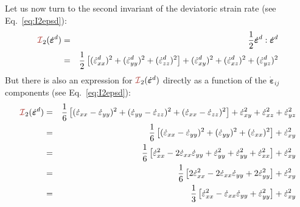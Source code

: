 Let us now turn to the second invariant of the deviatoric strain rate 
(see Eq.~\eqref{eq:I2epsd}):
\begin{eqnarray}
{\III}_2(\dot{\bm{\varepsilon}}^d)
&=& \frac{1}{2} \dot{\bm{\varepsilon}}^d:\dot{\bm{\varepsilon}}^d \\
&=& \frac{1}{2} \left[ (\dot{\varepsilon}_{xx}^d)^2 + (\dot{\varepsilon}_{yy}^d)^2 + (\dot{\varepsilon}_{zz}^d)^2   \right] 
+ (\dot{\varepsilon}_{xy}^d)^2  
+ (\dot{\varepsilon}_{xz}^d)^2  
+ (\dot{\varepsilon}_{yz}^d)^2  
\end{eqnarray}
But there is also an expression for ${\III}_2(\dot{\bm{\varepsilon}}^d)$ directly as a function of the $\dot{\bm\varepsilon}_{ij}$ components 
(see Eq.~\eqref{eq:I2epsd}):
\begin{eqnarray}
{\III}_2(\dot{\bm{\varepsilon}}^d)
&=& \frac{1}{6} \left[ (\dot{\varepsilon}_{xx}-\dot{\varepsilon}_{yy})^2 
+ (\dot{\varepsilon}_{yy}-\dot{\varepsilon}_{zz})^2 
+ (\dot{\varepsilon}_{xx}-\dot{\varepsilon}_{zz})^2 \right] 
+ \dot{\varepsilon}_{xy}^2 + \dot{\varepsilon}_{xz}^2 + \dot{\varepsilon}_{yz}^2 \\
&=& 
\frac{1}{6} \left[ (\dot{\varepsilon}_{xx}-\dot{\varepsilon}_{yy})^2 
+ (\dot{\varepsilon}_{yy})^2 
+ (\dot{\varepsilon}_{xx})^2 \right] 
+ \dot{\varepsilon}_{xy}^2 \\
&=& \frac{1}{6} \left[ \dot{\varepsilon}_{xx}^2 
-2\dot{\varepsilon}_{xx}\dot{\varepsilon}_{yy}
+\dot{\varepsilon}_{yy}^2 
+ \dot{\varepsilon}_{yy}^2 
+ \dot{\varepsilon}_{xx}^2 \right] 
+ \dot{\varepsilon}_{xy}^2 \\
&=& \frac{1}{6} \left[ 
2\dot{\varepsilon}_{xx}^2 
-2\dot{\varepsilon}_{xx}\dot{\varepsilon}_{yy}
+2\dot{\varepsilon}_{yy}^2 
\right] 
+ \dot{\varepsilon}_{xy}^2 \\
&=& 
\frac{1}{3} \left[ 
\dot{\varepsilon}_{xx}^2 
-\dot{\varepsilon}_{xx}\dot{\varepsilon}_{yy}
+\dot{\varepsilon}_{yy}^2 
\right] 
+ \dot{\varepsilon}_{xy}^2 
\end{eqnarray}

